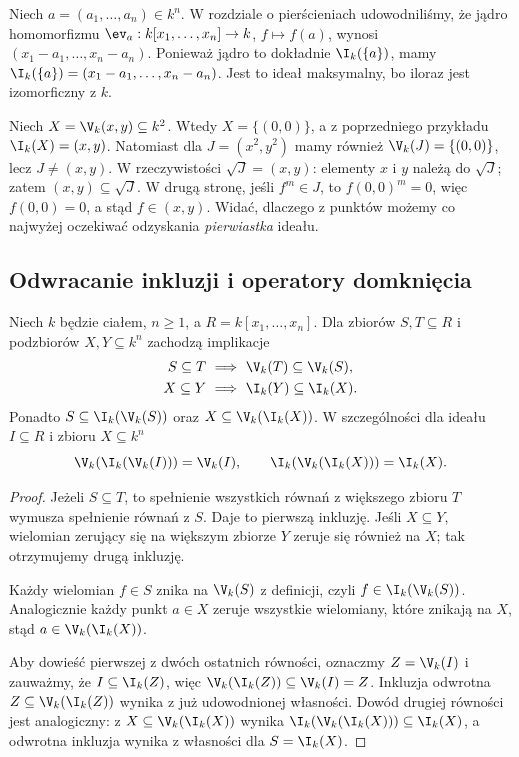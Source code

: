 \begin{przyklad}
Niech $a=(a_1,\dots,a_n)\in k^n$. W rozdziale o pierścieniach
udowodniliśmy, że jądro homomorfizmu
$\ev_a:k[x_1,\dots,x_n]\to k$, $f\mapsto f(a)$,
wynosi $(x_1-a_1,\dots,x_n-a_n)$.
Ponieważ jądro to dokładnie $\I_k(\{a\})$, mamy
$\I_k(\{a\})=(x_1-a_1,\dots,x_n-a_n)$.
Jest to ideał maksymalny, bo iloraz jest izomorficzny z $k$.
\end{przyklad}

\begin{przyklad}
Niech $X=\V_k(x,y)\subseteq k^2$. Wtedy $X=\{(0,0)\}$,
a z poprzedniego przykładu $\I_k(X)=(x,y)$.
Natomiast dla $J=(x^2,y^2)$ mamy również
$\V_k(J)=\{(0,0)\}$, lecz $J\ne(x,y)$.
W rzeczywistości $\sqrt J=(x,y)$: elementy $x$ i $y$
należą do $\sqrt J$; zatem $(x,y)\subseteq\sqrt J$.
W drugą stronę, jeśli $f^m\in J$, to $f(0,0)^m=0$,
więc $f(0,0)=0$, a stąd $f\in(x,y)$.
Widać, dlaczego z punktów możemy co najwyżej oczekiwać
odzyskania \emph{pierwiastka} ideału.
\end{przyklad}

\subsection{Odwracanie inkluzji i operatory domknięcia}

\begin{twierdzenie}
\label{tw:galois}
Niech $k$ będzie ciałem, $n\ge1$, a $R=k[x_1,\dots,x_n]$.
Dla zbiorów $S,T\subseteq R$ i podzbiorów $X,Y\subseteq k^n$
zachodzą implikacje
\begin{align*}
S\subseteq T&\ \Longrightarrow\ \V_k(T)\subseteq\V_k(S),\\
X\subseteq Y&\ \Longrightarrow\ \I_k(Y)\subseteq\I_k(X).
\end{align*}
Ponadto $S\subseteq\I_k(\V_k(S))$ oraz
$X\subseteq\V_k(\I_k(X))$.
W szczególności dla ideału $I\subseteq R$ i zbioru $X\subseteq k^n$
\[
\V_k(\I_k(\V_k(I)))=\V_k(I),\qquad
\I_k(\V_k(\I_k(X)))=\I_k(X).
\]
\end{twierdzenie}
\begin{proof}
Jeżeli $S\subseteq T$, to spełnienie wszystkich równań
z większego zbioru $T$ wymusza spełnienie równań z $S$.
Daje to pierwszą inkluzję. Jeśli $X\subseteq Y$, wielomian
zerujący się na większym zbiorze $Y$ zeruje się również na $X$;
tak otrzymujemy drugą inkluzję.

Każdy wielomian $f\in S$ znika na $\V_k(S)$ z definicji,
czyli $f\in\I_k(\V_k(S))$. Analogicznie każdy punkt $a\in X$
zeruje wszystkie wielomiany, które znikają na $X$, stąd
$a\in\V_k(\I_k(X))$.

Aby dowieść pierwszej z dwóch ostatnich równości, oznaczmy
$Z=\V_k(I)$ i zauważmy, że $I\subseteq\I_k(Z)$, więc
$\V_k(\I_k(Z))\subseteq\V_k(I)=Z$. Inkluzja odwrotna
$Z\subseteq\V_k(\I_k(Z))$ wynika z już udowodnionej własności.
Dowód drugiej równości jest analogiczny: z
$X\subseteq\V_k(\I_k(X))$ wynika
$\I_k(\V_k(\I_k(X)))\subseteq\I_k(X)$,
a odwrotna inkluzja wynika z własności dla $S=\I_k(X)$.
\end{proof}

